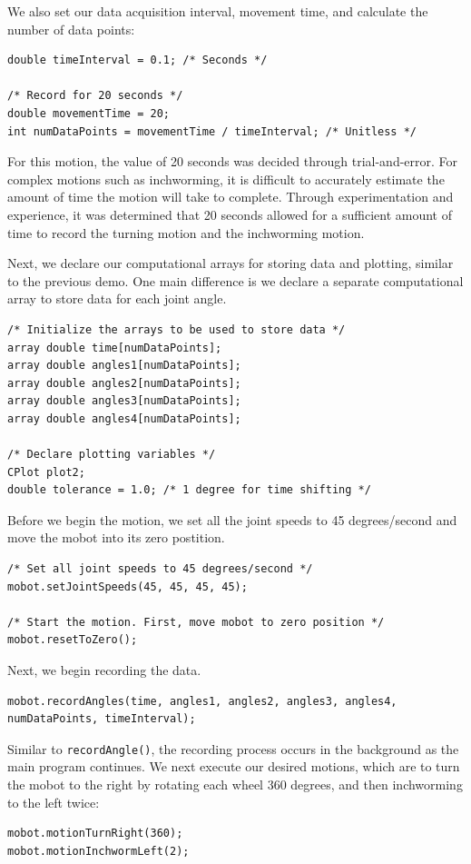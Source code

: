 \documentclass{article}
\begin{document}
We also set our data acquisition interval, movement time, and calculate
the number of data points:
\begin{verbatim}
double timeInterval = 0.1; /* Seconds */

/* Record for 20 seconds */
double movementTime = 20;
int numDataPoints = movementTime / timeInterval; /* Unitless */
\end{verbatim}
For this motion, the value of 20 seconds was decided through trial-and-error.
For complex motions such as inchworming, it is difficult to accurately estimate the 
amount of time the motion will take to complete. Through experimentation and experience,
it was determined that 20 seconds allowed for a sufficient amount of time to record the 
turning motion and the inchworming motion. 

Next, we declare our computational arrays for storing data and plotting, similar to 
the previous demo. One main difference is we declare a separate computational array
to store data for each joint angle.
\begin{verbatim}
/* Initialize the arrays to be used to store data */
array double time[numDataPoints];
array double angles1[numDataPoints];
array double angles2[numDataPoints];
array double angles3[numDataPoints];
array double angles4[numDataPoints];

/* Declare plotting variables */
CPlot plot2;
double tolerance = 1.0; /* 1 degree for time shifting */
\end{verbatim}

Before we begin the motion, we set all the joint speeds to 45 degrees/second
and move the mobot into its zero postition.
\begin{verbatim}
/* Set all joint speeds to 45 degrees/second */
mobot.setJointSpeeds(45, 45, 45, 45);

/* Start the motion. First, move mobot to zero position */
mobot.resetToZero();
\end{verbatim}

Next, we begin recording the data.
\begin{verbatim}
mobot.recordAngles(time, angles1, angles2, angles3, angles4, numDataPoints, timeInterval);
\end{verbatim}

Similar to \texttt{recordAngle()}, the recording process occurs in the background as
the main program continues. We next execute our desired motions, which are to turn the
mobot to the right by rotating each wheel 360 degrees, and then inchworming to
the left twice:
\begin{verbatim}
mobot.motionTurnRight(360);
mobot.motionInchwormLeft(2);
\end{verbatim}
\end{document}
